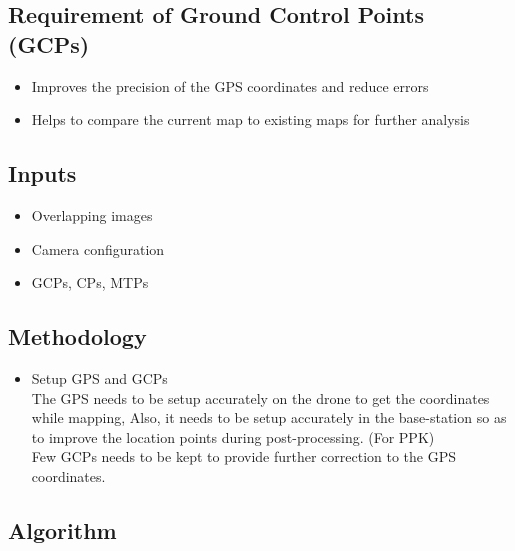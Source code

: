 \documentclass{article}[11pt]
\begin{document}
\subsection{Requirement of Ground Control Points (GCPs)}
\begin{itemize}
    \item Improves the precision of the GPS coordinates and reduce errors
    \item Helps to compare the current map to existing maps for further analysis
\end{itemize}



\subsection{Inputs}
\begin{itemize}
    \item Overlapping images
    \item Camera configuration
    \item  GCPs, CPs, MTPs
\end{itemize}

\subsection{Methodology}
\begin{itemize}
    \item Setup GPS and GCPs
    \\ The GPS needs to be setup accurately on the drone to get the coordinates while mapping, Also, it needs to be setup accurately in the base-station so as to improve the location points during post-processing. (For PPK)
    \\ Few GCPs needs to be kept to provide further correction to the GPS coordinates.
\end{itemize}

\subsection{Algorithm}
\end{document}
